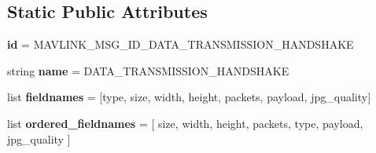 \subsection*{Static Public Attributes}
\begin{DoxyCompactItemize}
\item 
\mbox{\label{classpymavlink_1_1dialects_1_1v10_1_1MAVLink__data__transmission__handshake__message_a9a6c54dd7c2175bcac0f80b3bf6dbee4}} 
{\bfseries id} = M\+A\+V\+L\+I\+N\+K\+\_\+\+M\+S\+G\+\_\+\+I\+D\+\_\+\+D\+A\+T\+A\+\_\+\+T\+R\+A\+N\+S\+M\+I\+S\+S\+I\+O\+N\+\_\+\+H\+A\+N\+D\+S\+H\+A\+KE
\item 
\mbox{\label{classpymavlink_1_1dialects_1_1v10_1_1MAVLink__data__transmission__handshake__message_af1a51e8f69d2eb2d359672101087d6fc}} 
string {\bfseries name} = \textquotesingle{}D\+A\+T\+A\+\_\+\+T\+R\+A\+N\+S\+M\+I\+S\+S\+I\+O\+N\+\_\+\+H\+A\+N\+D\+S\+H\+A\+KE\textquotesingle{}
\item 
\mbox{\label{classpymavlink_1_1dialects_1_1v10_1_1MAVLink__data__transmission__handshake__message_a666c164f8a71c23c3f713ff3b75fbdaa}} 
list {\bfseries fieldnames} = \mbox{[}\textquotesingle{}type\textquotesingle{}, \textquotesingle{}size\textquotesingle{}, \textquotesingle{}width\textquotesingle{}, \textquotesingle{}height\textquotesingle{}, \textquotesingle{}packets\textquotesingle{}, \textquotesingle{}payload\textquotesingle{}, \textquotesingle{}jpg\+\_\+quality\textquotesingle{}\mbox{]}
\item 
\mbox{\label{classpymavlink_1_1dialects_1_1v10_1_1MAVLink__data__transmission__handshake__message_a148c79174497f57c2604a1bb013e299c}} 
list {\bfseries ordered\+\_\+fieldnames} = \mbox{[} \textquotesingle{}size\textquotesingle{}, \textquotesingle{}width\textquotesingle{}, \textquotesingle{}height\textquotesingle{}, \textquotesingle{}packets\textquotesingle{}, \textquotesingle{}type\textquotesingle{}, \textquotesingle{}payload\textquotesingle{}, \textquotesingle{}jpg\+\_\+quality\textquotesingle{} \mbox{]}
\item 

\end{DoxyCompactItemize}
